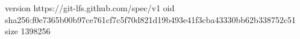 version https://git-lfs.github.com/spec/v1
oid sha256:f0e7365b00b97ce761cf7c5f70d821d19b493e41f3cba43330bb62b338752c51
size 1398256
